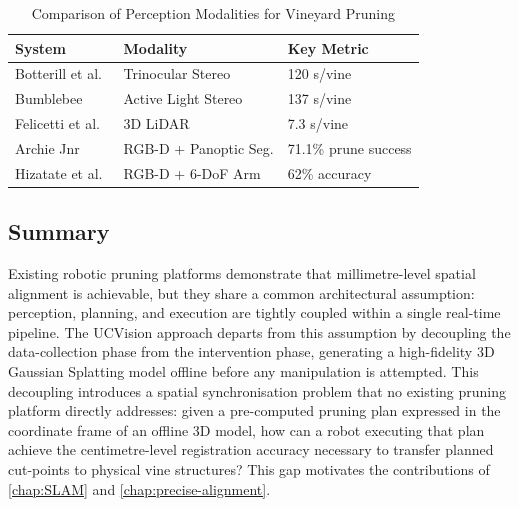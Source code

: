 \begin{table}[h]
\centering
\caption{Comparison of Perception Modalities for Vineyard Pruning}
\label{tab:perception}
\begin{tabularx}{\textwidth}{|X|l|l|}
\hline
\textbf{System} & \textbf{Modality} & \textbf{Key Metric} \\ \hline
Botterill et al.~\cite{botterillRobotSystemPruning2017} & Trinocular Stereo & 120 s/vine \\ \hline
Bumblebee~\cite{silwalBumblebeePath2022} & Active Light Stereo & 137 s/vine \\ \hline
Felicetti et al.~\cite{felicettiTractorMountedGrapevine2025} & 3D LiDAR & 7.3 s/vine \\ \hline
Archie Jnr~\cite{williamsArchieJnrRobotic2024} & RGB-D + Panoptic Seg. & 71.1\% prune success \\ \hline
Hizatate et al.~\cite{hizatateDevelopmentRobotPruning2025} & RGB-D + 6-DoF Arm & 62\% accuracy \\ \hline
\end{tabularx}
\end{table}

\subsection{Summary}
\label{subsec:vineyard-pruning-summary}

Existing robotic pruning platforms demonstrate that millimetre-level spatial alignment is achievable, but they share a common architectural assumption: perception, planning, and execution are tightly coupled within a single real-time pipeline. The UCVision approach departs from this assumption by decoupling the data-collection phase from the intervention phase, generating a high-fidelity 3D Gaussian Splatting model offline before any manipulation is attempted. This decoupling introduces a spatial synchronisation problem that no existing pruning platform directly addresses: given a pre-computed pruning plan expressed in the coordinate frame of an offline 3D model, how can a robot executing that plan achieve the centimetre-level registration accuracy necessary to transfer planned cut-points to physical vine structures? This gap motivates the contributions of \cref{chap:SLAM} and \cref{chap:precise-alignment}.

